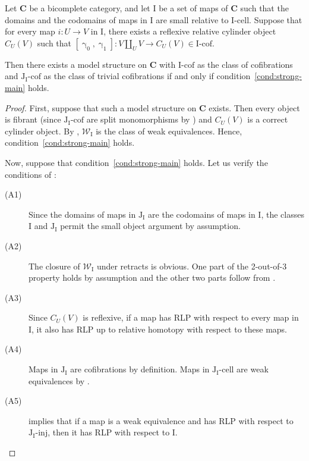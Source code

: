 \documentclass{tac}
\theoremstyle{definition}
\newcommand{\we}{\mathcal{W}}
\newcommand{\cat}[1]{\mathbf{#1}}
\newcommand{\C}{\cat{C}}
\newcommand{\I}{\mathrm{I}}
\newcommand{\J}{\mathrm{J}}
\newcommand{\class}[2]{#1\text{-}\mathrm{#2}}
\newcommand{\Iinj}[1][\I]{\class{#1}{inj}}
\newcommand{\Icell}[1][\I]{\class{#1}{cell}}
\newcommand{\Icof}[1][\I]{\class{#1}{cof}}
\newcommand{\Jinj}[1][]{\Iinj[\J#1]}
\newcommand{\Jcell}[1][]{\Icell[\J#1]}
\newcommand{\Jcof}[1][]{\Icof[\J#1]}
\newcommand{\cyli}{\upgamma}
\begin{document}
\begin{thm}[main]
Let $\C$ be a bicomplete category, and let $\I$ be a set of maps of $\C$ such that the domains and the codomains of maps in $\I$ are small relative to $\Icell$.
Suppose that for every map $i : U \to V$ in $\I$, there exists a reflexive relative cylinder object $C_U(V)$ such that $[\cyli_0,\cyli_1] : V \amalg_U V \to C_U(V) \in \Icof$.

Then there exists a model structure on $\C$ with $\Icof$ as the class of cofibrations and $\Jcof[_\I]$ as the class of trivial cofibrations
if and only if condition~\eqref{cond:strong-main} holds.
\end{thm}
\begin{proof}
First, suppose that such a model structure on $\C$ exists.
Then every object is fibrant (since $\Jcof[_\I]$ are split monomorphisms by ) and $C_U(V)$ is a correct cylinder object.
By , $\we_\I$ is the class of weak equivalences.
Hence, condition~\eqref{cond:strong-main} holds.

Now, suppose that condition~\eqref{cond:strong-main} holds.
Let us verify the conditions of :
\begin{description}
\item[(A1)] Since the domains of maps in $\J_\I$ are the codomains of maps in $\I$, the classes $\I$ and $\J_\I$ permit the small object argument by assumption.
\item[(A2)] The closure of $\we_\I$ under retracts is obvious.
One part of the 2-out-of-3 property holds by assumption and the other two parts follow from .
\item[(A3)] Since $C_U(V)$ is reflexive, if a map has RLP with respect to every map in $\I$, it also has RLP up to relative homotopy with respect to these maps.
\item[(A4)] Maps in $\J_\I$ are cofibrations by definition. Maps in $\Jcell[_\I]$ are weak equivalences by .
\item[(A5)]  implies that if a map is a weak equivalence and has RLP with respect to $\Jinj[_\I]$, then it has RLP with respect to $\I$.
\end{description}
\end{proof}
\end{document}
